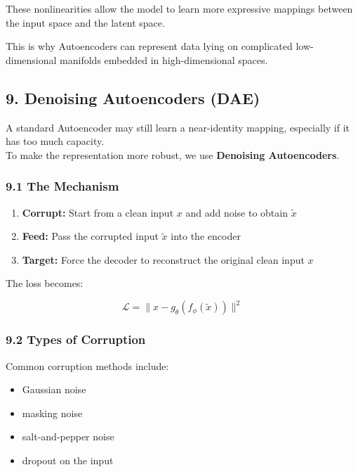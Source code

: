 \documentclass[
  italian,
  11pt,
]{article}
\begin{document}
These nonlinearities allow the model to learn more expressive mappings
between the input space and the latent space.

This is why Autoencoders can represent data lying on complicated
low-dimensional manifolds embedded in high-dimensional spaces.

\subsection{9. Denoising Autoencoders
(DAE)}\label{denoising-autoencoders-dae}

A standard Autoencoder may still learn a near-identity mapping,
especially if it has too much capacity.\\
To make the representation more robust, we use \textbf{Denoising
Autoencoders}.

\subsubsection{9.1 The Mechanism}\label{the-mechanism}

\begin{enumerate}
\def\labelenumi{\arabic{enumi}.}
\item
  \textbf{Corrupt:} Start from a clean input \(x\) and add noise to
  obtain \(\tilde{x}\)
\item
  \textbf{Feed:} Pass the corrupted input \(\tilde{x}\) into the encoder
\item
  \textbf{Target:} Force the decoder to reconstruct the original clean
  input \(x\)
\end{enumerate}

The loss becomes:

\[
\mathcal{L} = \|x - g_\theta(f_\phi(\tilde{x}))\|^2
\]

\subsubsection{9.2 Types of Corruption}\label{types-of-corruption}

Common corruption methods include:

\begin{itemize}
\item
  Gaussian noise
\item
  masking noise
\item
  salt-and-pepper noise
\item
  dropout on the input
\end{itemize}
\end{document}
